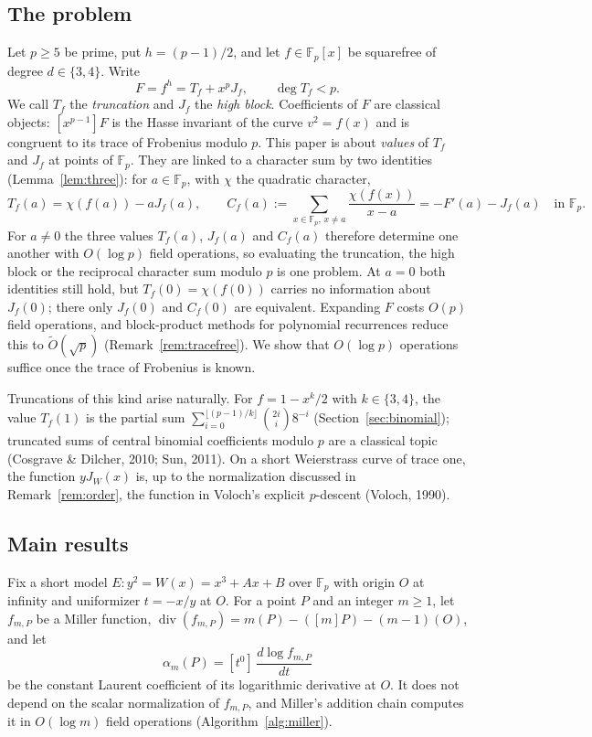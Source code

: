 \documentclass[11pt,a4paper]{article}
\numberwithin{equation}{section}
\theoremstyle{plain}
\theoremstyle{definition}
\DeclareMathOperator{\divisor}{div}
\newcommand{\F}{\mathbb{F}}
\begin{document}
\subsection{The problem}
Let $p\ge5$ be prime, put $h=(p-1)/2$, and let $f\in\F_p[x]$ be squarefree of degree $d\in\{3,4\}$. Write
\begin{equation}\label{eq:FTJ}
F=f^{h}=T_f+x^pJ_f,\qquad \deg T_f<p .
\end{equation}
We call $T_f$ the \emph{truncation} and $J_f$ the \emph{high block}. Coefficients of $F$ are classical objects: $[x^{p-1}]F$ is the Hasse invariant of the curve $v^2=f(x)$ and is congruent to its trace of Frobenius modulo $p$. This paper is about \emph{values} of $T_f$ and $J_f$ at points of $\F_p$. They are linked to a character sum by two identities (Lemma~\ref{lem:three}): for $a\in\F_p$, with $\chi$ the quadratic character,
\begin{equation}\label{eq:three-intro}
T_f(a)=\chi(f(a))-aJ_f(a),\qquad
C_f(a):=\sum_{x\in\F_p,\,x\neq a}\frac{\chi(f(x))}{x-a}=-F'(a)-J_f(a)\quad\text{in }\F_p .
\end{equation}
For $a\neq0$ the three values $T_f(a)$, $J_f(a)$ and $C_f(a)$ therefore determine one another with $O(\log p)$ field operations, so evaluating the truncation, the high block or the reciprocal character sum modulo $p$ is one problem. At $a=0$ both identities still hold, but $T_f(0)=\chi(f(0))$ carries no information about $J_f(0)$; there only $J_f(0)$ and $C_f(0)$ are equivalent. Expanding $F$ costs $O(p)$ field operations, and block-product methods for polynomial recurrences reduce this to $\widetilde O(\sqrt p)$ (Remark~\ref{rem:tracefree}). We show that $O(\log p)$ operations suffice once the trace of Frobenius is known.

Truncations of this kind arise naturally. For $f=1-x^k/2$ with $k\in\{3,4\}$, the value $T_f(1)$ is the partial sum $\sum_{i=0}^{\lfloor(p-1)/k\rfloor}\binom{2i}{i}8^{-i}$ (Section~\ref{sec:binomial}); truncated sums of central binomial coefficients modulo $p$ are a classical topic (Cosgrave \& Dilcher, 2010; Sun, 2011). On a short Weierstrass curve of trace one, the function $yJ_W(x)$ is, up to the normalization discussed in Remark~\ref{rem:order}, the function in Voloch's explicit $p$-descent (Voloch, 1990).

\subsection{Main results}
Fix a short model $E:y^2=W(x)=x^3+Ax+B$ over $\F_p$ with origin $O$ at infinity and uniformizer $t=-x/y$ at $O$. For a point $P$ and an integer $m\ge1$, let $f_{m,P}$ be a Miller function, $\divisor(f_{m,P})=m(P)-([m]P)-(m-1)(O)$, and let
\begin{equation}\label{eq:alpha-intro}
\alpha_m(P)=[t^0]\,\frac{d\log f_{m,P}}{dt}
\end{equation}
be the constant Laurent coefficient of its logarithmic derivative at $O$. It does not depend on the scalar normalization of $f_{m,P}$, and Miller's addition chain computes it in $O(\log m)$ field operations (Algorithm~\ref{alg:miller}).
\end{document}
